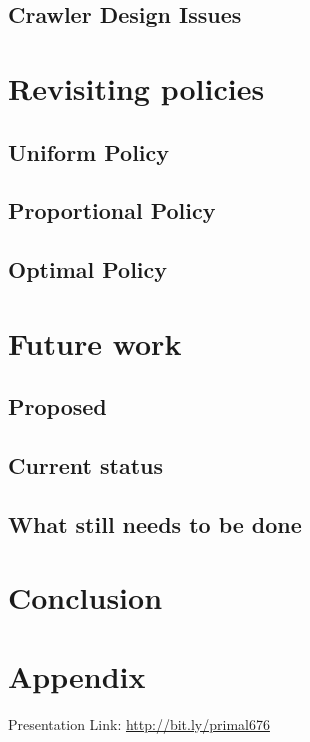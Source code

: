 \documentclass[a4paper, 11pt]{article} %
\begin{document}
\subsection{Crawler Design Issues}

\section{Revisiting policies}

\subsection{Uniform Policy}

\subsection{Proportional Policy}

\subsection{Optimal Policy}

\section{Future work}

\subsection{Proposed}

\subsection{Current status}

\subsection{What still needs to be done}

\section{Conclusion}

\section*{Appendix}

Presentation Link: \url{http://bit.ly/primal676}







\end{document}
